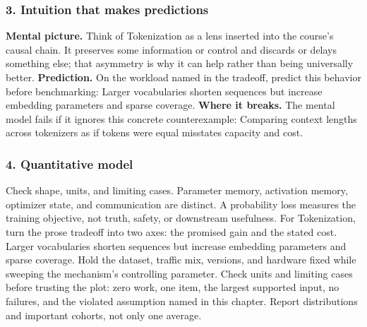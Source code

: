 \subsubsection*{3. Intuition that makes predictions}
\textbf{Mental picture.} Think of Tokenization as a lens inserted into the course's causal chain. It preserves some information or control and discards or delays something else; that asymmetry is why it can help rather than being universally better.
\textbf{Prediction.} On the workload named in the tradeoff, predict this behavior before benchmarking: Larger vocabularies shorten sequences but increase embedding parameters and sparse coverage.
\textbf{Where it breaks.} The mental model fails if it ignores this concrete counterexample: Comparing context lengths across tokenizers as if tokens were equal misstates capacity and cost.
\subsubsection*{4. Quantitative model}
Check shape, units, and limiting cases. Parameter memory, activation memory, optimizer state, and communication are distinct. A probability loss measures the training objective, not truth, safety, or downstream usefulness.
For Tokenization, turn the prose tradeoff into two axes: the promised gain and the stated cost. Larger vocabularies shorten sequences but increase embedding parameters and sparse coverage. Hold the dataset, traffic mix, versions, and hardware fixed while sweeping the mechanism's controlling parameter.
Check units and limiting cases before trusting the plot: zero work, one item, the largest supported input, no failures, and the violated assumption named in this chapter. Report distributions and important cohorts, not only one average.
